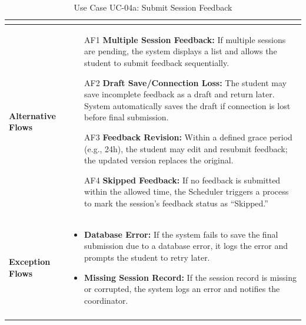 \begin{center}
\begin{longtable}{|p{3cm}|p{11cm}|}
\begin{itemize}
\end{itemize} \\ 
\hline
\textbf{Alternative Flows} & 
\begin{itemize}
    \item[AF1] \textbf{Multiple Session Feedback:} If multiple sessions are pending, the system displays a list and allows the student to submit feedback sequentially.
    \item[AF2] \textbf{Draft Save/Connection Loss:} The student may save incomplete feedback as a draft and return later. System automatically saves the draft if connection is lost before final submission.
    \item[AF3] \textbf{Feedback Revision:} Within a defined grace period (e.g., 24h), the student may edit and resubmit feedback; the updated version replaces the original.
    \item[AF4] \textbf{Skipped Feedback:} If no feedback is submitted within the allowed time, the Scheduler triggers a process to mark the session's feedback status as ``Skipped.'' 
\end{itemize} \\ 
\hline
\textbf{Exception Flows} & 
\begin{itemize}
    \item \textbf{Database Error:} If the system fails to save the final submission due to a database error, it logs the error and prompts the student to retry later.
    \item \textbf{Missing Session Record:} If the session record is missing or corrupted, the system logs an error and notifies the coordinator.
\end{itemize} \\ 
\hline
\caption{Use Case UC-04a: Submit Session Feedback}
\end{longtable}
\end{center}

